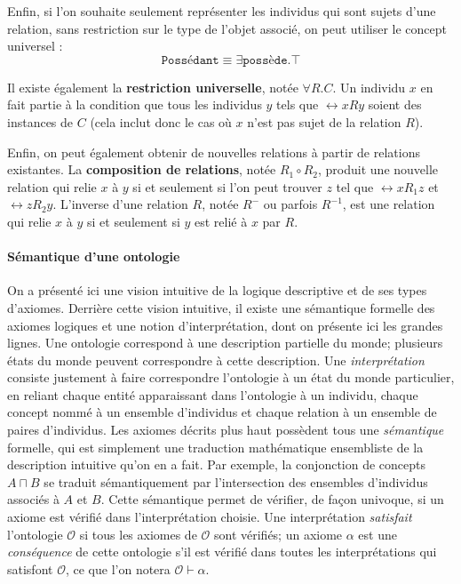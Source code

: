Enfin, si l'on souhaite seulement représenter les individus qui sont sujets d'une relation, sans restriction sur le type de l'objet associé, on peut utiliser le concept universel :
\begin{equation}
    \texttt{Possédant} \equiv \exists \texttt{possède}.\top
\end{equation}

Il existe également la \textbf{restriction universelle}, notée $\forall R.C$. Un individu $x$ en fait partie à la condition que tous les individus $y$ tels que $\rel{x}{R}{y}$ %
soient des instances de $C$ (cela inclut donc le cas où $x$ n'est pas sujet de la relation $R$).

Enfin, on peut également obtenir de nouvelles relations à partir de relations existantes. La \textbf{composition de relations}, notée $R_1 \circ R_2$, produit une nouvelle relation qui relie $x$ à $y$ si et seulement si l'on peut trouver $z$ tel que $\rel{x}{R_1}{z}$ et $\rel{z}{R_2}{y}$. L'inverse d'une relation $R$, notée $R^-$ ou parfois $R^{-1}$, est une relation qui relie $x$ à $y$ si et seulement si $y$ est relié à $x$ par $R$.


\paragraph{Sémantique d'une ontologie}


On a présenté ici une vision intuitive de la logique descriptive et de ses types d'axiomes. Derrière cette vision intuitive, il existe une sémantique formelle des axiomes logiques et une notion d'interprétation, dont on présente ici les grandes lignes.
Une ontologie correspond à une description partielle du monde; plusieurs états du monde peuvent correspondre à cette description. Une \textit{interprétation} consiste justement à faire correspondre l'ontologie à un état du monde particulier, en reliant chaque entité apparaissant dans l'ontologie à un individu, chaque concept nommé à un ensemble d'individus et chaque relation à un ensemble de paires d'individus. Les axiomes décrits plus haut possèdent tous une \textit{sémantique} formelle, qui est simplement une traduction mathématique ensembliste de la description intuitive qu'on en a fait. Par exemple, la conjonction de concepts $A \sqcap B$ se traduit sémantiquement par l'intersection des ensembles d'individus associés à $A$ et $B$. Cette sémantique permet de vérifier, de façon univoque, si un axiome est vérifié dans l'interprétation choisie. Une interprétation \textit{satisfait} l'ontologie $\mathcal{O}$ si tous les axiomes de $\mathcal{O}$ sont vérifiés; un axiome $\alpha$ est une \textit{conséquence} de cette ontologie s'il est vérifié dans toutes les interprétations qui satisfont $\mathcal{O}$, ce que l'on notera $\mathcal{O} \vdash \alpha$.

